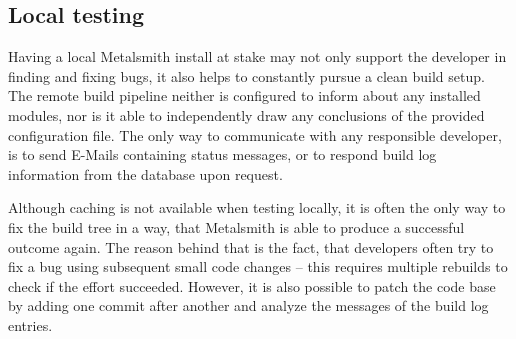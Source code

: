 \subsection{Local testing}
Having a local Metalsmith install at stake may not only support the developer in finding and fixing bugs, it also helps to constantly pursue a clean build setup. The remote build pipeline neither is configured to inform about any installed modules, nor is it able to independently draw any conclusions of the provided configuration file. The only way to communicate with any responsible developer, is to send E-Mails containing status messages, or to respond build log information from the database upon request.

Although caching is not available when testing locally, it is often the only way to fix the build tree in a way, that Metalsmith is able to produce a successful outcome again. The reason behind that is the fact, that developers often try to fix a bug using subsequent small code changes -- this requires multiple rebuilds to check if the effort succeeded. However, it is also possible to patch the code base by adding one commit after another and analyze the messages of the build log entries.

